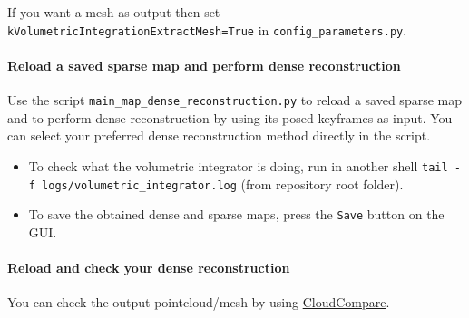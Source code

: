 \documentclass{article}
\providecommand{\tightlist}{%
  \setlength{\itemsep}{0pt}\setlength{\parskip}{0pt}}
\let\oldparagraph\paragraph
\renewcommand{\paragraph}[1]{\oldparagraph{#1}\mbox{}}
\begin{document}
If you want a mesh as output then set
\texttt{kVolumetricIntegrationExtractMesh=True} in
\texttt{config\_parameters.py}.

\hypertarget{reload-a-saved-sparse-map-and-perform-dense-reconstruction}{%
\paragraph{Reload a saved sparse map and perform dense
reconstruction}\label{reload-a-saved-sparse-map-and-perform-dense-reconstruction}}

Use the script \texttt{main\_map\_dense\_reconstruction.py} to reload a
saved sparse map and to perform dense reconstruction by using its posed
keyframes as input. You can select your preferred dense reconstruction
method directly in the script.

\begin{itemize}
\tightlist
\item
  To check what the volumetric integrator is doing, run in another shell
  \texttt{tail\ -f\ logs/volumetric\_integrator.log} (from repository
  root folder).
\item
  To save the obtained dense and sparse maps, press the \texttt{Save}
  button on the GUI.
\end{itemize}

\hypertarget{reload-and-check-your-dense-reconstruction}{%
\paragraph{Reload and check your dense
reconstruction}\label{reload-and-check-your-dense-reconstruction}}

You can check the output pointcloud/mesh by using
\href{https://www.cloudcompare.org/}{CloudCompare}.
\end{document}
